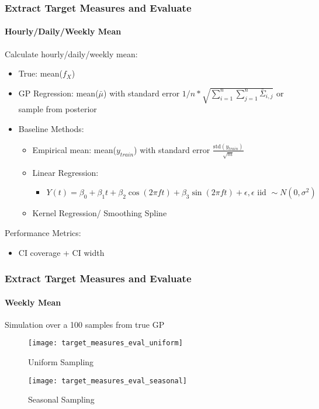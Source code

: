 \documentclass[
	8pt, %
]{beamer}
\begin{document}
\begin{frame}
	\frametitle{Extract Target Measures and Evaluate}
	\framesubtitle{Hourly/Daily/Weekly Mean} %

	Calculate hourly/daily/weekly mean:
	\begin{itemize}
		\item True: mean($f_{X}$)
		\item GP Regression: mean($\bar{\mu}$) with standard error
		$1 / n * \sqrt {\sum_{i=1}^{n}\sum_{j=1}^{n} \bar{\Sigma}_{i,j}}$ or sample from posterior
		\item Baseline Methods:
		\begin{itemize}
			\item Empirical mean: mean($y_{train}$) with standard error $\frac{\text{std}(y_{train})}{\sqrt{m}}$
			\item Linear Regression:
			\begin{itemize}
				\item $Y(t) = \beta_0 + \beta_1 t + \beta_2 \cos(2 \pi f t) + \beta_3 \sin(2 \pi f t) + \epsilon, \epsilon \text{ iid } \sim N(0, \sigma^2)$

			\end{itemize}
			\item Kernel Regression/ Smoothing Spline
		\end{itemize}
	\end{itemize}

	\bigskip

	Performance Metrics:
	\begin{itemize}
		\item CI coverage + CI width
	\end{itemize}
\end{frame}



\begin{frame}
	\frametitle{Extract Target Measures and Evaluate}
	\framesubtitle{Weekly Mean} %

	Simulation over a 100 samples from true GP

	\begin{figure}
			\texttt{[image: target\_measures\_eval\_uniform]}
			\caption{Uniform Sampling}
	\end{figure}

		\begin{figure}
			\texttt{[image: target\_measures\_eval\_seasonal]}
			\caption{Seasonal Sampling}
	\end{figure}


\end{frame}
\end{document}
